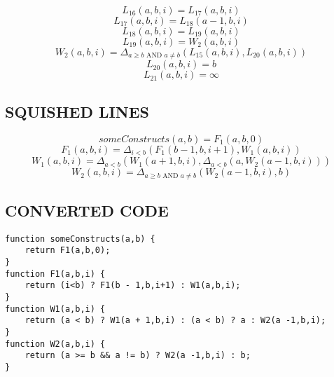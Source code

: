 \documentclass{article}
\begin{document}
\begin{dmath*}
L_{16}(a,b,i) = L_{17}(a,b,i)
\end{dmath*}
\begin{dmath*}
L_{17}(a,b,i) = L_{18}(a -1,b,i)
\end{dmath*}
\begin{dmath*}
L_{18}(a,b,i) = L_{19}(a,b,i)
\end{dmath*}
\begin{dmath*}
L_{19}(a,b,i) = W_{2}(a,b,i)
\end{dmath*}
\begin{dmath*}
W_{2}(a,b,i) = \Delta_{a \geq b \text{ AND } a \ne b}(L_{15}(a,b,i),L_{20}(a,b,i))
\end{dmath*}
\begin{dmath*}
L_{20}(a,b,i) = b
\end{dmath*}
\begin{dmath*}
L_{21}(a,b,i) = \infty
\end{dmath*}


\subsection{SQUISHED LINES}
\begin{dmath*}
someConstructs(a,b) = F_{1}(a,b,0)
\end{dmath*}
\begin{dmath*}
F_{1}(a,b,i) = \Delta_{i<b}(F_{1}(b - 1,b,i+1),W_{1}(a,b,i))
\end{dmath*}
\begin{dmath*}
W_{1}(a,b,i) = \Delta_{a < b}(W_{1}(a + 1,b,i),\Delta_{a < b}(a,W_{2}(a -1,b,i)))
\end{dmath*}
\begin{dmath*}
W_{2}(a,b,i) = \Delta_{a \geq b \text{ AND } a \ne b}(W_{2}(a -1,b,i),b)
\end{dmath*}


\subsection{CONVERTED CODE}
\begin{lstlisting}
function someConstructs(a,b) {
    return F1(a,b,0);
}
function F1(a,b,i) {
    return (i<b) ? F1(b - 1,b,i+1) : W1(a,b,i);
}
function W1(a,b,i) {
    return (a < b) ? W1(a + 1,b,i) : (a < b) ? a : W2(a -1,b,i);
}
function W2(a,b,i) {
    return (a >= b && a != b) ? W2(a -1,b,i) : b;
}

\end{lstlisting}
\end{document}

